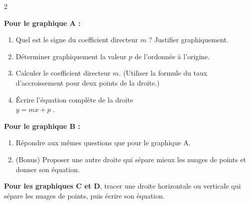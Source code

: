 	\vspace{-1cm}
	\begin{multicols}{2}

		\begin{MADenumerate}
			\item \textbf{Pour le graphique A :}
			\begin{enumerate}
				\item Quel est le signe du coefficient directeur $m$ ? Justifier graphiquement.
				\item Déterminer graphiquement la valeur $p$ de l'ordonnée à l'origine.
				\item Calculer le coefficient directeur $m$. (Utiliser la formule du taux d'accroissement pour deux points de la droite.)
				\item Écrire l'équation complète de la droite\\ $y=m x + p$ .
			\end{enumerate}

			\columnbreak

			\item \textbf{Pour le graphique B :}
			\begin{enumerate}
				\item Répondre aux mêmes questions que pour le graphique A.
				\item (Bonus) Proposer une autre droite qui sépare mieux les nuages de points et donner son équation.
			\end{enumerate}

			\item \textbf{Pour les graphiques C et D}, tracer une droite horizontale ou verticale qui sépare les nuages de points, puis écrire son équation.

		\end{MADenumerate}

	\end{multicols}
